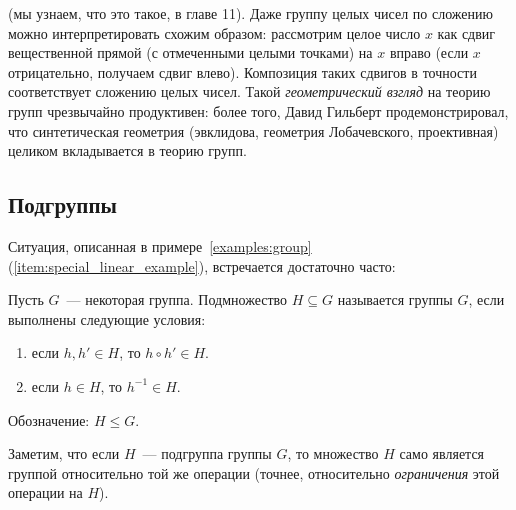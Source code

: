 \begin{examples}
\begin{enumerate}
  (мы узнаем, что это такое, в главе 11). Даже группу целых чисел по
  сложению можно интерпретировать схожим образом: рассмотрим целое
  число $x$ как сдвиг вещественной прямой (с отмеченными целыми
  точками) на $x$ вправо (если $x$ отрицательно, получаем сдвиг
  влево). Композиция таких сдвигов в точности соответствует сложению
  целых чисел. Такой {\it геометрический взгляд} на теорию групп
  чрезвычайно продуктивен: более того, Давид Гильберт
  продемонстрировал, что синтетическая геометрия (эвклидова, геометрия
  Лобачевского, проективная) целиком вкладывается в теорию групп.
\end{enumerate}
\end{examples}

\subsection{Подгруппы}


Ситуация, описанная в примере~\ref{examples:group}
(\ref{item:special_linear_example}),
встречается достаточно часто:
\begin{definition}\label{def:subgroup}
Пусть $G$~--- некоторая группа. Подмножество $H\subseteq G$ называется
 группы $G$, если выполнены следующие
условия:
\begin{enumerate}
\item если $h,h'\in H$, то $h\circ h'\in H$.
\item если $h\in H$, то $h^{-1}\in H$.
\end{enumerate}
Обозначение: $H\leq G$.
\end{definition}
Заметим, что если $H$~--- подгруппа группы $G$, то множество $H$ само
является группой относительно той же операции (точнее, относительно
{\em ограничения} этой операции на $H$).

